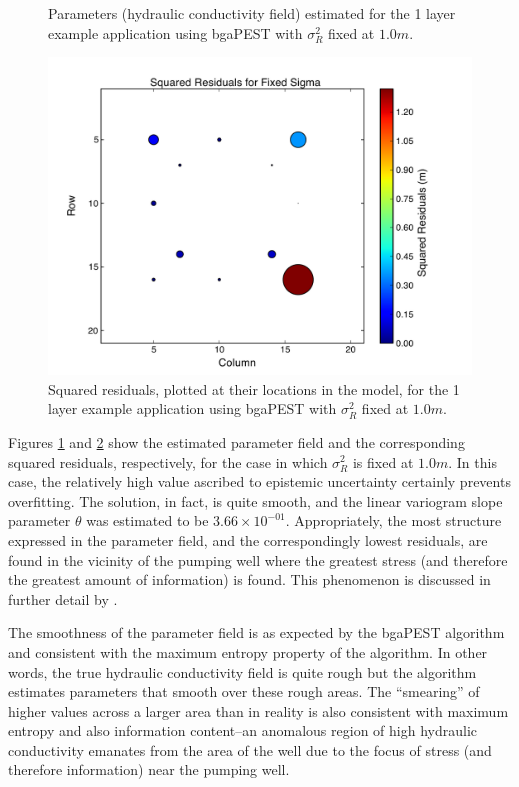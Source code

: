 \documentclass[11pt,oneside,onecolumn]{usgsreport}
\begin{document}
\begin{appendix}
\begin{figure}[!t]
\caption{\label{fig:KL1-sigfixed}Parameters (hydraulic conductivity field)
estimated for the 1 layer example application using bgaPEST with $\sigma_{R}^{2}$
fixed at $1.0m$.}
\end{figure}


\begin{figure}[!t]
\begin{center} \includegraphics[scale=0.4]{figures/1_layer_fixed_sigma_residuals}\end{center}

\caption{\label{fig:residL1-sigfixed}Squared residuals, plotted at their locations
in the model, for the 1 layer example application using bgaPEST with
$\sigma_{R}^{2}$ fixed at $1.0m$.}
\end{figure}


Figures \ref{fig:KL1-sigfixed} and \ref{fig:residL1-sigfixed} show
the estimated parameter field and the corresponding squared residuals,
respectively, for the case in which $\sigma_{R}^{2}$ is fixed at
$1.0m$. In this case, the relatively high value ascribed to epistemic
uncertainty certainly prevents overfitting. The solution, in fact,
is quite smooth, and the linear variogram slope parameter $\theta$
was estimated to be $3.66\times10^{-01}$. Appropriately, the most
structure expressed in the parameter field, and the correspondingly
lowest residuals, are found in the vicinity of the pumping well where
the greatest stress (and therefore the greatest amount of information)
is found. This phenomenon is discussed in further detail by \citet{FienenWRR2008}.

The smoothness of the parameter field is as expected by the bgaPEST
algorithm and consistent with the maximum entropy property of the
algorithm. In other words, the true hydraulic conductivity field is
quite rough but the algorithm estimates parameters that smooth over
these rough areas. The ``smearing'' of higher values across a larger
area than in reality is also consistent with maximum entropy and also
information content--an anomalous region of high hydraulic conductivity
emanates from the area of the well due to the focus of stress (and
therefore information) near the pumping well.


\end{appendix}
\end{document}
